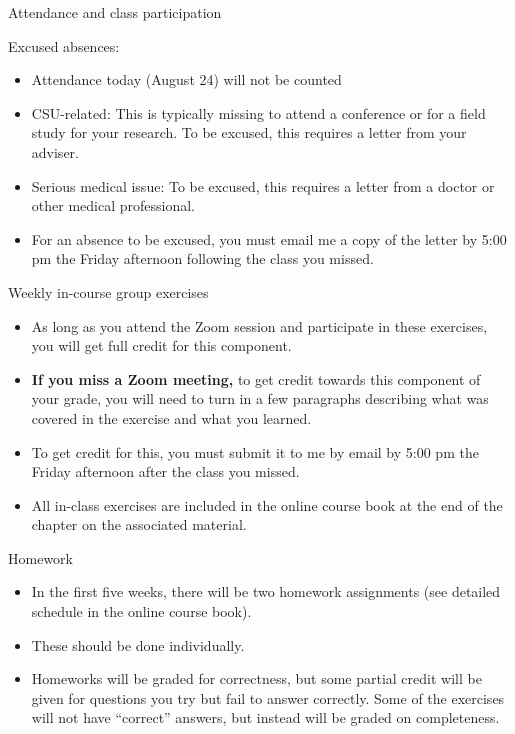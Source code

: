 \documentclass[
  10pt,
  ignorenonframetext,
]{beamer}
\providecommand{\tightlist}{%
  \setlength{\itemsep}{0pt}\setlength{\parskip}{0pt}}
\begin{document}
\begin{frame}{Attendance and class participation}
\protect\hypertarget{attendance-and-class-participation-7}{}

Excused absences:

\begin{itemize}
\tightlist
\item
  Attendance today (August 24) will not be counted
\item
  CSU-related: This is typically missing to attend a conference or for a
  field study for your research. To be excused, this requires a letter
  from your adviser.
\item
  Serious medical issue: To be excused, this requires a letter from a
  doctor or other medical professional.
\item
  For an absence to be excused, you must email me a copy of the letter
  by 5:00 pm the Friday afternoon following the class you missed.
\end{itemize}

\end{frame}

\begin{frame}{Weekly in-course group exercises}
\protect\hypertarget{weekly-in-course-group-exercises}{}

\begin{itemize}
\tightlist
\item
  As long as you attend the Zoom session and participate in these
  exercises, you will get full credit for this component.
\item
  \textbf{If you miss a Zoom meeting,} to get credit towards this
  component of your grade, you will need to turn in a few paragraphs
  describing what was covered in the exercise and what you learned.
\item
  To get credit for this, you must submit it to me by email by 5:00 pm
  the Friday afternoon after the class you missed.
\item
  All in-class exercises are included in the online course book at the
  end of the chapter on the associated material.
\end{itemize}

\end{frame}

\begin{frame}{Homework}
\protect\hypertarget{homework}{}

\begin{itemize}
\tightlist
\item
  In the first five weeks, there will be two homework assignments (see
  detailed schedule in the online course book).
\item
  These should be done individually.
\item
  Homeworks will be graded for correctness, but some partial credit will
  be given for questions you try but fail to answer correctly. Some of
  the exercises will not have ``correct'' answers, but instead will be
  graded on completeness.
\end{itemize}

\end{frame}
\end{document}
